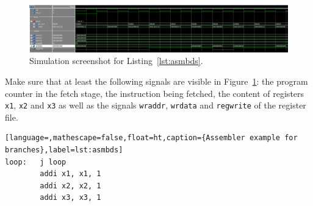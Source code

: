 \begin{figure}[ht!]
	\centering
	\includegraphics[width=1.0\linewidth]{exe4task2.png}
	\caption{Simulation screenshot for Listing~\ref{lst:asmbds}.}
	\label{fig:sim2}
\end{figure}

Make sure that at least the following signals are visible in
Figure~\ref{fig:sim2}: the program counter in the fetch stage, the
instruction being fetched, the content of registers \texttt{x1}, 
\texttt{x2} and \texttt{x3} as well as the signals \texttt{wraddr},
\texttt{wrdata} and \texttt{regwrite} of the register file.

\begin{lstlisting}[language=,mathescape=false,float=ht,caption={Assembler example for branches},label=lst:asmbds]
loop:   j loop
        addi x1, x1, 1
        addi x2, x2, 1
        addi x3, x3, 1
\end{lstlisting}

